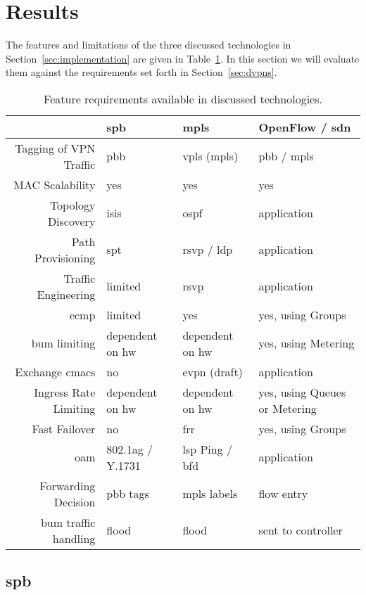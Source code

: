\section{Results} %
\label{sec:results}

The features and limitations of the three discussed technologies in Section~\ref{sec:implementation} are given in Table~\ref{tb:reqs}. In this section we will evaluate them against the requirements set forth in Section~\ref{sec:dvpns}.

\begin{table}[h]
	\centering
	\begin{tabular}{r|lll}
	 & \acs{spb} & \acs{mpls} & OpenFlow / \acs{sdn}\\
	\hline
	Tagging of VPN Traffic & \acs{pbb} & \acs{vpls} (\acs{mpls}) & \acs{pbb} / \acs{mpls}\\
	MAC Scalability & yes & yes & yes\\
	Topology Discovery & \acs{isis} & \acs{ospf} & application\\
	Path Provisioning & \acs{spt} & \acs{rsvp} / \acs{ldp} & application\\
	Traffic Engineering & limited & \acs{rsvp} & application\\
	\ac{ecmp} & limited & yes & yes, using Groups\\
	\ac{bum} limiting & dependent on \acs{hw} & dependent on \acs{hw} & yes, using Metering\\
	Exchange \acsp{cmac} & no & \ac{evpn} (draft) & application\\
	Ingress Rate Limiting & dependent on \acs{hw} & dependent on \acs{hw} & yes, using Queues or Metering\\
	Fast Failover & no & \acs{frr} & yes, using Groups\\
	\acs{oam} & 802.1ag / Y.1731 & \acs{lsp} Ping / \acs{bfd} & application\\
	\hline
	Forwarding Decision & \acs{pbb} tags & \acs{mpls} labels & flow entry \\
	\ac{bum} traffic handling & flood & flood & sent to controller\\
	\end{tabular}
	\caption{Feature requirements available in discussed technologies.}
	\label{tb:reqs}
\end{table}


\subsection{\acs{spb}} %
\label{sub:spb}

